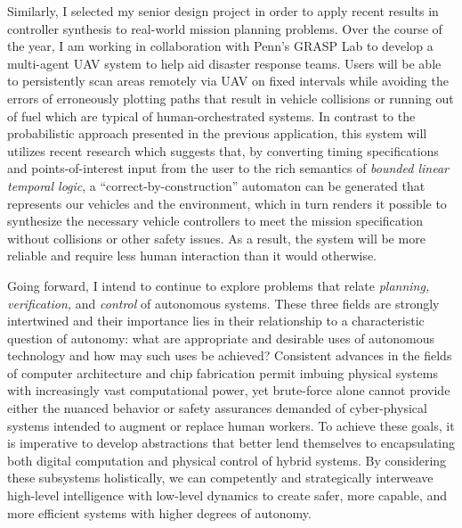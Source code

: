 \documentclass[11pt]{letter}
\begin{document}
Similarly, I selected my senior design project in order to apply recent results in controller synthesis to real-world mission planning problems. Over the course of the year, I am working in collaboration with Penn's GRASP Lab to develop a multi-agent UAV system to help aid disaster response teams. Users will be able to persistently scan areas remotely via UAV on fixed intervals while avoiding the errors of erroneously plotting paths that result in vehicle collisions or running out of fuel which are typical of human-orchestrated systems. In contrast to the probabilistic approach presented in the previous application, this system will utilizes recent research which suggests that, by converting timing specifications and points-of-interest input from the user to the rich semantics of \emph{bounded linear temporal logic}, a ``correct-by-construction'' automaton can be generated that represents our vehicles and the environment, which in turn renders it possible to synthesize the necessary vehicle controllers to meet the mission specification without collisions or other safety issues.  As a result, the system will be more reliable and require less human interaction than it would otherwise.

Going forward, I intend to continue to explore problems that relate \emph{planning, verification,} and \emph{control} of autonomous systems.  These three fields are strongly intertwined and their importance lies in their relationship to a characteristic question of autonomy:  what are appropriate and desirable uses of autonomous technology and how may such uses be achieved? Consistent advances in the fields of computer architecture and chip fabrication permit imbuing physical systems with increasingly vast computational power, yet brute-force alone cannot provide either the nuanced behavior or safety assurances demanded of cyber-physical systems intended to augment or replace human workers. To achieve these goals, it is imperative to develop abstractions that better lend themselves to encapsulating both digital computation and physical control of hybrid systems. By considering these subsystems holistically, we can competently and strategically interweave high-level intelligence with low-level dynamics to create safer, more capable, and more efficient systems with higher degrees of autonomy.  
\end{document}
